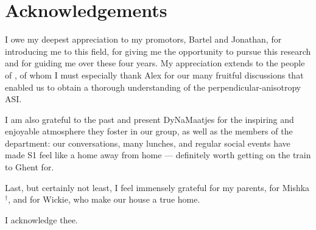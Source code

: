 \newpage
\thispagestyle{empty}
\null
\newpage

\clearpage
\thispagestyle{empty}


\chapter*{Acknowledgements}\label{sec:Acknowledgements}
I owe my deepest appreciation to my promotors, Bartel and Jonathan, for introducing me to this field, for giving me the opportunity to pursue this research and for guiding me over these four years.
My appreciation extends to the people of \spinengine, of whom I must especially thank Alex for our many fruitful discussions that enabled us to obtain a thorough understanding of the perpendicular-anisotropy ASI. \\\par


I am also grateful to the past and present DyNaMaatjes for the inspiring and enjoyable atmosphere they foster in our group, as well as the members of the department: our conversations, many lunches, and regular social events have made S1 feel like a home away from home --- definitely worth getting on the train to Ghent for.
\\\par

Last, but certainly not least, I feel immensely grateful for my parents, for Mishka$^\dagger$, and for Wickie, who make our house a true home. \\\par

I acknowledge thee.
\clearpage
